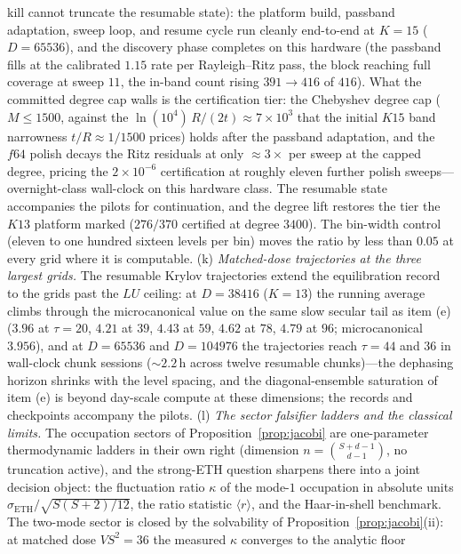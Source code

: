 \begin{remark}
kill cannot truncate the resumable state): the platform build, passband
adaptation, sweep loop, and resume cycle run cleanly end-to-end at
$K=15$ ($D=65536$), and the discovery phase completes on this hardware
(the passband fills at the calibrated $1.15$ rate per Rayleigh--Ritz pass,
the block reaching full coverage at sweep $11$, the in-band count rising
$391\to416$ of $416$). What the committed degree cap walls is the
certification tier: the Chebyshev degree cap ($M\le1500$, against the
$\ln(10^{4})\,R/(2t)\approx7\times10^{3}$ that the initial $K15$ band
narrowness $t/R\approx1/1500$ prices) holds after the passband adaptation,
and the $f64$ polish decays the Ritz residuals at only
$\approx3\times$ per sweep at the capped degree, pricing the
$2\times10^{-6}$ certification at roughly eleven further polish
sweeps---overnight-class wall-clock on this hardware class. The resumable
state accompanies the pilots for continuation, and the degree lift
restores the tier the $K13$ platform marked ($276/370$ certified at
degree $3400$).
The bin-width control (eleven to one hundred sixteen levels per
bin) moves the ratio by less than $0.05$ at every grid where it is computable.
(k) \emph{Matched-dose trajectories at the three largest grids.} The
resumable Krylov trajectories extend the equilibration record to the grids
past the $LU$ ceiling: at $D=38416$ ($K=13$) the running average climbs
through the microcanonical value on the same slow secular tail as item (e)
($3.96$ at $\tau=20$, $4.21$ at $39$, $4.43$ at $59$, $4.62$ at $78$, $4.79$
at $96$; microcanonical $3.956$), and at $D=65536$ and $D=104976$ the
trajectories reach $\tau=44$ and $36$ in wall-clock chunk sessions
($\sim2.2$\,h across twelve resumable chunks)---the dephasing horizon
shrinks with the level spacing, and the diagonal-ensemble saturation of item
(e) is beyond day-scale compute at these dimensions; the records and
checkpoints accompany the pilots.
(l) \emph{The sector falsifier ladders and the classical limits.} The
occupation sectors of Proposition~\ref{prop:jacobi} are one-parameter
thermodynamic ladders in their own right (dimension
$n=\binom{S+d-1}{d-1}$, no truncation active), and the strong-ETH question
sharpens there into a joint decision object: the fluctuation ratio $\kappa$
of the mode-$1$ occupation in absolute units
$\sigma_{\mathrm{ETH}}/\sqrt{S(S+2)/12}$, the ratio statistic $\langle
r\rangle$, and the Haar-in-shell benchmark. The two-mode sector is closed
by the solvability of Proposition~\ref{prop:jacobi}(ii): at matched dose
$VS^{2}=36$ the measured $\kappa$ converges to the analytic floor

\end{remark}
